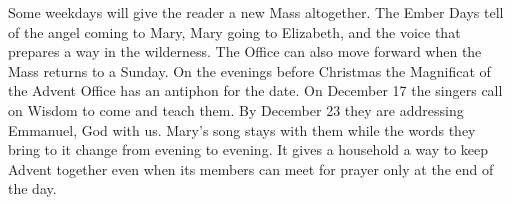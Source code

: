 Some weekdays will give the reader a new Mass altogether. The Ember
Days tell of the angel coming to Mary, Mary going to Elizabeth, and
the voice that prepares a way in the wilderness. The Office can also
move forward when the Mass returns to a Sunday. On the evenings
before Christmas the Magnificat of the Advent Office has an
antiphon for the date. On December 17 the singers call on Wisdom to
come and teach them. By December 23 they are addressing Emmanuel,
God with us. Mary's song stays with them while the words they bring
to it change from evening to evening. It gives a household a way to
keep Advent together even when its members can meet for prayer only
at the end of the day.
